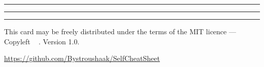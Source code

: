 \documentclass[10pt]{article}
\begin{document}
\begin{multicols*}{3}
\vspace*{0.2cm}
\hrule
\vspace*{0.03cm}
\hrule













\vfill \hrule\smallskip

{\small
This card may be freely distributed under
the terms of the MIT licence ---
Copyleft \textcopyleft\ \thedate{} \href{http://kitakitsune.org}{\theauthor}. Version 1.0.

\url{https://github.com/Bystroushaak/SelfCheatSheet}
}

\end{multicols*}
\end{document}
